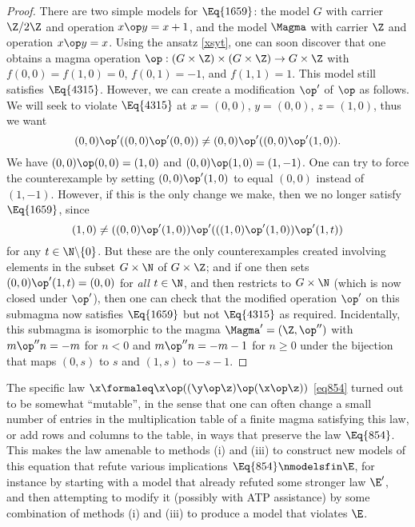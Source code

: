 \begin{proof}  There are two simple models for $\Eq{1659}$: the model $G$ with carrier $\Z/2\Z$ and operation $x \op y = x+1$, and the model $\Magma$ with carrier $\Z$ and operation $x \op y = x$.  Using the ansatz \eqref{xsyt}, one can soon discover that one obtains a magma operation $\op: (G \times \Z) \times (G \times \Z) \to G \times \Z$ with $f(0,0)=f(1,0)=0$, $f(0,1)=-1$, and $f(1,1)=1$.  This model still satisfies $\Eq{4315}$. However, we can create a modification $\op'$ of $\op$ as follows.  We will seek to violate $\Eq{4315}$ at $x = (0,0)$, $y = (0,0)$, $z = (1,0)$, thus we want
$$ (0,0) \op' ((0,0) \op' (0,0)) \neq (0,0) \op' ((0,0) \op' (1,0)).$$
We have $(0,0) \op (0,0) = (1,0)$ and $(0,0) \op (1,0) = (1,-1)$.  One can try to force the counterexample by setting $(0,0) \op' (1,0)$ to equal $(0,0)$ instead of $(1,-1)$. However, if this is the only change we make, then we no longer satisfy $\Eq{1659}$, since
$$ (1,0) \neq ((0,0) \op' (1,0)) \op' (((1,0) \op' (1,0)) \op' (1,t))$$
for any $t \in \N \backslash \{0\}$. But these are the only counterexamples created involving elements in the subset $G \times \N$ of $G \times \Z$; and if one then sets $(0,0) \op' (1,t) = (0,0)$ for \emph{all} $t \in \N$, and then restricts to $G \times \N$ (which is now closed under $\op'$), then one can check that the modified operation $\op'$ on this submagma now satisfies $\Eq{1659}$ but not $\Eq{4315}$ as required.
Incidentally, this submagma is isomorphic to the magma $\Magma'=(\Z,\op'')$ with $m\op''n=-m$ for $n<0$ and $m\op''n=-m-1$ for $n\geq 0$ under the bijection that maps $(0,s)$ to $s$ and $(1,s)$ to $-s-1$.
\end{proof}

The specific law $\x \formaleq \x \op ((\y \op \z) \op (\x \op \z))$ \eqref{eq854} turned out to be somewhat ``mutable'', in the sense that one can often change a small number
 of entries in the multiplication table of a finite magma satisfying this law, or add rows and columns to the table,
 in ways that preserve the law $\Eq{854}$.  This makes the law amenable to methods (i) and (iii) to construct new models of this equation that
 refute various implications  $\Eq{854} \nmodelsfin \E$, for instance by starting with a model that already refuted some stronger law ${\E'}$, and then attempting to modify it
 (possibly with ATP assistance) by some combination of methods (i) and (iii) to produce a model that violates $\E$.

